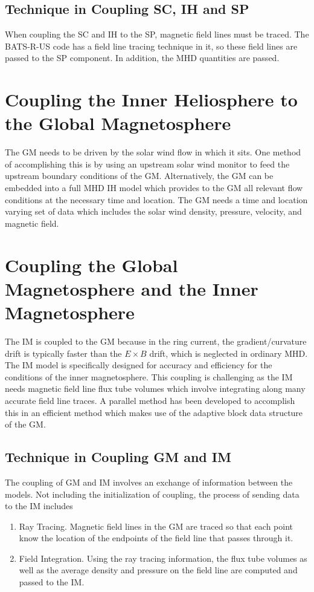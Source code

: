 \subsection{Technique in Coupling SC, IH and SP}

When coupling the SC and IH to the SP, magnetic field lines must be
traced.  The BATS-R-US code has a field line tracing technique in it,
so these field lines are passed to the SP component.  In addition, the
MHD quantities are passed.

\section{Coupling the Inner Heliosphere to the Global Magnetosphere}

The GM needs to be driven by the solar wind flow in which it sits.
One method of accomplishing this is by using an upstream solar wind
monitor to feed the upstream boundary conditions of the GM.
Alternatively, the GM can be embedded into a full MHD IH model which
provides to the GM all relevant flow conditions at the necessary time
and location.  The GM needs a time and location varying set of data
which includes the solar wind density, pressure, velocity, and
magnetic field.

\section{Coupling the Global Magnetosphere and the Inner Magnetosphere}

The IM is coupled to the GM because in the ring current, the
gradient/curvature drift is typically faster than the $E \times B$
drift, which is neglected in ordinary MHD.  The IM model is
specifically designed for accuracy and efficiency for the conditions of
the inner magnetosphere.  This coupling is challenging as the IM needs
magnetic field line flux tube volumes which involve integrating along
many accurate field line traces.  A parallel method has been developed
to accomplish this in an efficient method which makes use of the
adaptive block data structure of the GM.

\subsection{Technique in Coupling GM and IM}

The coupling of GM and IM involves an exchange of information between
the models.  Not including the initialization of coupling, the process
of sending data to the IM includes
\begin{enumerate}
\item Ray Tracing.  Magnetic field lines in the GM are traced so that
  each point know the location of the endpoints of the field line that
  passes through it.
\item Field Integration.  Using the ray tracing information, the flux
  tube volumes as well as the average density and pressure on the field
  line are computed and passed to the IM.
\end{enumerate}


